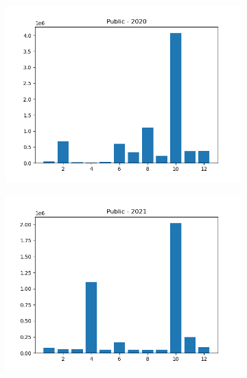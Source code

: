 \documentclass{article}
\begin{document}
\begin{figure}[H]
\begin{subfigure}{.5\textwidth}
    \end{subfigure}
    \begin{subfigure}{.5\textwidth}
        \centering
        \includegraphics[width=\textwidth]{../../output/figures/annual_source_distribution/Public_data_dist_2020.png}
    \end{subfigure}
    \begin{subfigure}{.5\textwidth}
        \centering
        \includegraphics[width=\textwidth]{../../output/figures/annual_source_distribution/Public_data_dist_2021.png}
    \end{subfigure}
    \begin{subfigure}{.5\textwidth}
        \centering

\end{subfigure}
\end{figure}
\end{document}
